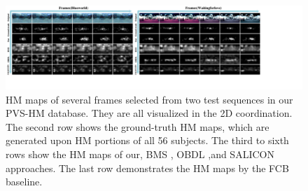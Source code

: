 \documentclass[10pt,journal,compsoc]{IEEEtran}
\begin{document}
\begin{figure}
	\begin{center}
		\centerline{\includegraphics[width=2\columnwidth]{figures/experiment/objective_result_1}}%
		\caption{\footnotesize{HM maps of several frames selected from two test sequences in our PVS-HM database. They are all visualized in the 2D coordination.  The second row shows the ground-truth HM maps, which are generated upon HM portions of all 56 subjects. The third to sixth rows show the HM maps of our, BMS \cite{zhang2016exploiting} , OBDL \cite{hossein2015many},and {SALICON} approaches. The last row demonstrates the HM maps by the FCB baseline.}}
		\label{figure-object}
	\end{center}
\end{figure}
\end{document}
